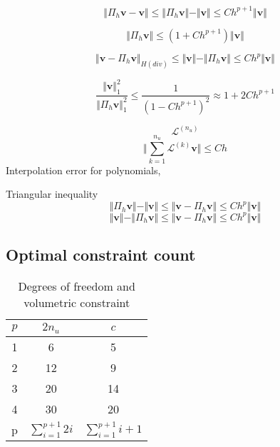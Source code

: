 \begin{equation}
\Vert \Pi_h \boldsymbol v - \boldsymbol v \Vert \le \Vert \Pi_h \boldsymbol v \Vert - \Vert \boldsymbol v \Vert \le Ch^{p+1}\Vert \boldsymbol v \Vert
\end{equation}

\begin{equation}
    \Vert \Pi_h \boldsymbol v \Vert \le (1+Ch^{p+1})\Vert \boldsymbol v \Vert
\end{equation}

\begin{equation}
    \Vert \boldsymbol v - \Pi_h \boldsymbol v \Vert_{H(div)} \le \Vert \boldsymbol v \Vert - \Vert \Pi_h \boldsymbol v \Vert \le Ch^{p}\Vert \boldsymbol v \Vert
\end{equation}

\begin{equation}
\frac{\Vert \boldsymbol v \Vert_1^2}{\Vert \Pi_h \boldsymbol v \Vert_1^2} \le \frac{1}{(1-Ch^{p+1})^2} \approx 1 + 2Ch^{p+1}
\end{equation}

\begin{equation}
    \mathcal L^{(n_u)}
\end{equation}
\begin{equation}
    \Vert \sum_{k=1}^{n_u} \mathcal L^{(k)} \boldsymbol v \Vert \le C h
\end{equation}
Interpolation error for polynomials, 

Triangular inequality
\begin{equation}
\Vert \Pi_h \boldsymbol v \Vert - \Vert \boldsymbol v \Vert \le \Vert \boldsymbol v - \Pi_h \boldsymbol v \Vert \le Ch^{p} \Vert \boldsymbol v \Vert
\end{equation}
\begin{equation}
\Vert \boldsymbol v \Vert - \Vert \Pi_h \boldsymbol v \Vert \le \Vert \boldsymbol v - \Pi_h \boldsymbol v \Vert \le Ch^{p} \Vert \boldsymbol v \Vert
\end{equation}

\subsection{Optimal constraint count}
\begin{table}[ht!]
\centering
\caption{Degrees of freedom and volumetric constraint}
\begin{tabular}{ccc}
\toprule
$p$ & $2n_u$ & $c$ \\
\midrule
1 & 6 & 5 \\
2 & 12 & 9 \\
3 & 20 & 14 \\
4 & 30 & 20 \\
p & $\sum_{i=1}^{p+1}2i$ & $\sum_{i=1}^{p+1}i+1$ \\
\bottomrule
\end{tabular}
\end{table}
